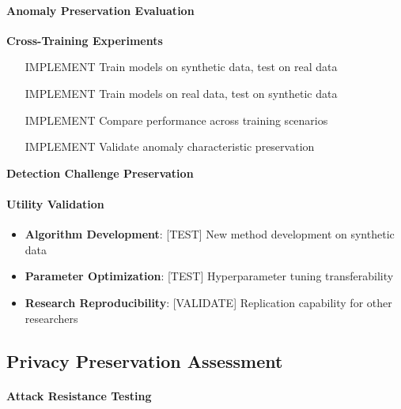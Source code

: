 \documentclass[runningheads]{llncs}
\begin{document}
\paragraph{Anomaly Preservation Evaluation}

\textbf{Cross-Training Experiments}
\begin{enumerate}
\item [IMPLEMENT] Train models on synthetic data, test on real data
\item [IMPLEMENT] Train models on real data, test on synthetic data
\item [IMPLEMENT] Compare performance across training scenarios
\item [IMPLEMENT] Validate anomaly characteristic preservation
\end{enumerate}

\textbf{Detection Challenge Preservation}

\paragraph{Utility Validation}

\begin{itemize}
\item \textbf{Algorithm Development}: [TEST] New method development on synthetic data
\item \textbf{Parameter Optimization}: [TEST] Hyperparameter tuning transferability
\item \textbf{Research Reproducibility}: [VALIDATE] Replication capability for other researchers
\end{itemize}

\subsection{Privacy Preservation Assessment}
\label{sec:privacy-eval}


\paragraph{Attack Resistance Testing}
\end{document}
